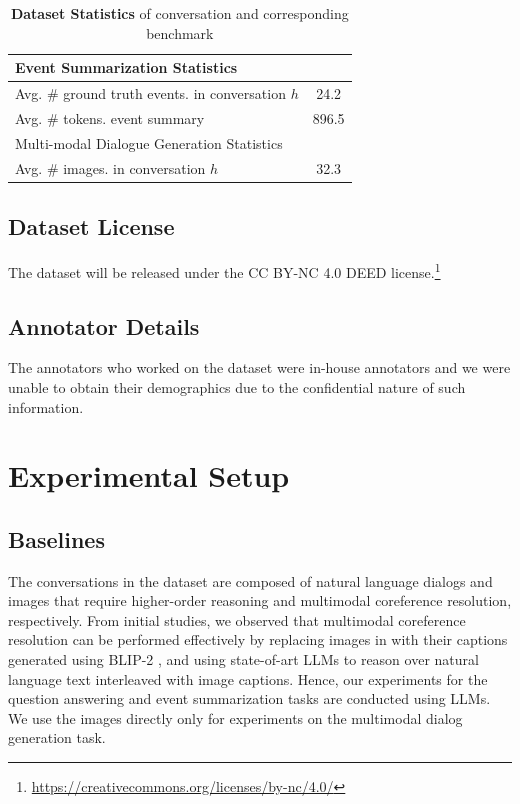 \begin{table}[t]
{\begin{tabular}{lc}
             \midrule
             \rowcolor{gray!20} Event Summarization Statistics & \\
             \midrule
             Avg. \# ground truth events. in conversation $h$ & 24.2 \\
             Avg. \# tokens. event summary & 896.5 \\
             \midrule
             \rowcolor{gray!20} Multi-modal Dialogue Generation Statistics & \\
             \midrule
             Avg. \# images. in conversation $h$ & 32.3 \\
            \bottomrule
        \end{tabular}
	}
        \caption{\textbf{Dataset Statistics} of conversation and corresponding benchmark}
	\label{tab:dataset_statistics}
\end{table}

\subsection{Dataset License}
The \dataset{} dataset will be released under the CC BY-NC 4.0 DEED license.\footnote{\url{https://creativecommons.org/licenses/by-nc/4.0/}}

\subsection{Annotator Details}
The annotators who worked on the \dataset{} dataset were in-house annotators and we were unable to obtain their demographics due to the confidential nature of such information.

\section{Experimental Setup}
\label{sec:experiments_appendix}

\subsection{Baselines}
\label{ssec:baselines-appendix}
The conversations in the \dataset{} dataset are composed of natural language dialogs and images that require higher-order reasoning and multimodal coreference resolution, respectively. From initial studies, we observed that multimodal coreference resolution can be performed effectively by replacing images in \dataset{} with their captions generated using BLIP-2 \cite{li2023blip}, and using state-of-art LLMs to reason over natural language text interleaved with image captions. Hence, our experiments for the question answering and event summarization tasks are conducted using LLMs. We use the images directly only for experiments on the multimodal dialog generation task.

